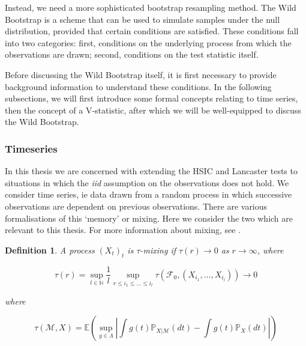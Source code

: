 \documentclass[12pt]{article}
\newtheorem{definition}{Definition}
\numberwithin{claim}{section}
\numberwithin{lemma}{section}
\numberwithin{theorem}{section}
\begin{document}
Instead, we need a more sophisticated bootstrap resampling method. The Wild Bootstrap \cite{leucht2013dependent} is a scheme that can be used to simulate samples under the null distribution, provided that certain conditions are satisfied. These conditions fall into two categories: first, conditions on the underlying process from which the observations are drawn; second, conditions on the test statistic itself.

Before discussing the Wild Bootstrap itself, it is first necessary to provide background information to understand these conditions. In the following subsections, we will first introduce some formal concepts relating to time series, then the concept of a V-statistic, after which we will be well-equipped to discuss the Wild Bootstrap.




\subsubsection{Timeseries}

In this thesis we are concerned with extending the HSIC and Lancaster tests to situations in which the \emph{iid} assumption on the observations does not hold. We consider time series, ie data drawn from a random process in which successive observations are dependent on previous observations. There are various formalisations of this `memory' or mixing. Here we consider the two which are relevant to this thesis. For more information about mixing, see \cite{doukhan1994mixing}\cite{bradley2005basic}\cite{dedecker2007weak}.

\begin{definition}
A process $(X_t)_{t}$ is \emph{$\tau$-mixing} if $\tau(r) \longrightarrow 0$ as $r\longrightarrow \infty$, where

\[\tau(r) = \sup_{l\in \mathbb{N}} \frac{1}{l} \sup_{r\leq i_1 \leq \ldots \leq i_l} \tau(\mathcal{F}_0,(X_{i_1}, \ldots, X_{i_l})) \longrightarrow 0\]

where

\[ \tau(\mathcal{M},X) = \mathbb{E} (\sup_{g \in \Lambda} | \int g(t) \mathbb{P}_{X|\mathcal{M}}(dt) -  \int g(t) \mathbb{P}_{X}(dt) |)\]

\end{definition}
\end{document}

